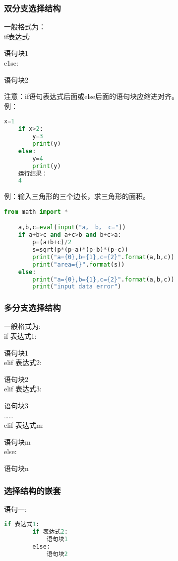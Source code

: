 \documentclass[11pt,a4paper]{article}
\begin{document}
\subsubsection{双分支选择结构}

一般格式为：\\
if表达式:

语句块1\\
e1se:

语句块2

注意：if语句表达式后面或else后面的语句块应缩进对齐。\\
例：
\begin{lstlisting}[language={Python}]
    x=1
    if x>2:
        y=3
        print(y)
    else:
        y=4
        print(y)
    运行结果：
    4
\end{lstlisting}
例：输入三角形的三个边长，求三角形的面积。
\begin{lstlisting}[language={Python}]
    from math import *

    a,b,c=eval(input("a， b， c="))
    if a+b>c and a+c>b and b+c>a:
        p=(a+b+c)/2
        s=sqrt(p*(p-a)*(p-b)*(p-c))
        print("a={0},b={1},c={2}".format(a,b,c))
        print("area={}".format(s))
    else:
        print("a={0},b={1},c={2}".format(a,b,c))
        print("input data error")
\end{lstlisting}

\subsubsection{多分支选择结构}

一般格式为:\\
if 表达式1:

语句块1\\
elif 表达式2:

语句块2\\
elif 表达式3:

语句块3\\
……\\
elif 表达式m:

语句块m\\
else:

语句块n

\subsubsection{选择结构的嵌套}

语句一:
\begin{lstlisting}[language={Python}]
    if 表达式1:
        if 表达式2:
            语句块1
        e1se:
            语句块2
\end{lstlisting}
\end{document}

